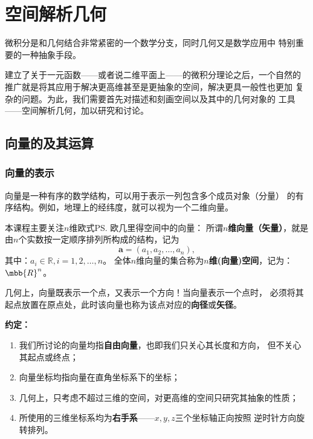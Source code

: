 \setcounter{chapter}{7}

\chapter{空间解析几何}

微积分是和几何结合非常紧密的一个数学分支，同时几何又是数学应用中
特别重要的一种抽象手段。

建立了关于一元函数——或者说二维平面上——的微积分理论之后，一个自然的
推广就是将其应用于解决更高维甚至是更抽象的空间，解决更具一般性也更加
复杂的问题。为此，我们需要首先对描述和刻画空间以及其中的几何对象的
工具——空间解析几何，加以研究和讨论。

\section{向量的及其运算}

\subsection{向量的表示}

向量是一种有序的数学结构，可以用于表示一列包含多个成员对象（分量）
的有序结构。例如，地理上的经纬度，就可以视为一个二维向量。

本课程主要关注{\kaishu $n$维欧式\ps{欧几里得}空间}中的向量：
所谓{\bf $n$维向量（矢量）}，就是由$n$个实数按一定顺序排列所构成的结构，记为
$$\bm{a}=(a_1,a_2,\ldots,a_n),$$
其中：$a_i\in\mathbb{R},i=1,2,\ldots,n$。
全体$n$维向量的集合称为{\bf $n$维(向量)空间}，记为：$\mbb{R}^n$。

几何上，向量既表示一个点，又表示一个方向！{\kaishu 当向量表示一个点时，
必须将其起点放置在原点处，此时该向量也称为该点对应的{\bf 向径}或{\bf 矢径}}。

\begin{thx}
	{\bf 约定：}
	\begin{enumerate}
	  \item 我们所讨论的向量均指{\bf 自由向量}，也即我们只关心其长度和方向，
	  但不关心其起点或终点；
	  \item 向量坐标均指向量在直角坐标系下的坐标；
	  \item 几何上，只考虑不超过三维的空间，对更高维的空间只研究其抽象的性质；
	  \item 所使用的三维坐标系均为{\bf 右手系}——$x,y,z$三个坐标轴正向按照
	  逆时针方向旋转排列。	  
	\end{enumerate}
\end{thx}

